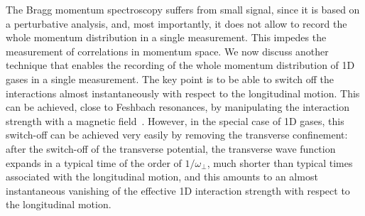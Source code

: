 \documentclass[onecolumn,amsfonts,showpacs,superscriptaddress]{revtex4-1}
\begin{document}



The Bragg momentum spectroscopy suffers from  small signal, since it is based on a perturbative analysis, and, most importantly, it does not allow to record the whole momentum distribution in a single measurement. This impedes the measurement of correlations in momentum space. We now discuss another technique that enables the recording of the whole momentum distribution of 1D gases in a single measurement. 
The key point is to be able to 
switch off the interactions 
almost instantaneously with respect to the 
longitudinal motion. 
This can be achieved, close to Feshbach resonances, by manipulating the interaction strength with a magnetic field~\citep{stewart_verification_2010}. However, in the special case of 1D gases, this switch-off can be achieved very easily by removing the transverse confinement: after the switch-off of the transverse potential, the transverse wave function expands in a typical time of the order of $1/\omega_\perp$, much shorter than typical times associated with the longitudinal motion, and this amounts to an almost instantaneous  vanishing of the effective 1D interaction strength with respect to the longitudinal motion. 
\end{document}
